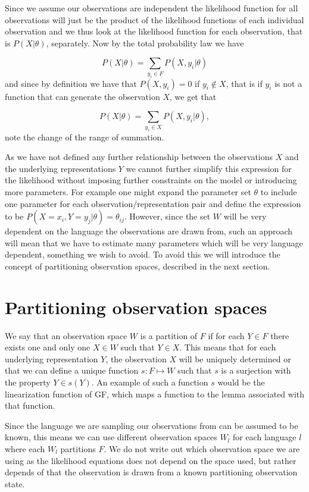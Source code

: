 Since we assume our observations are independent the likelihood function for all observations will just be the product of the likelihood functions of each individual observation and we thus look at the likelihood function for each observation, that is $P(X | \theta)$, separately. Now by the total probability law we have 

\begin{equation*}
P(X | \theta) = \sum_{y_i\in F}P(X,y_i | \theta)
\end{equation*}
and since by definition we have that $P(X,y_i)=0$ if $y_i\not\in X$, that is if $y_i$ is not a function that can generate the observation $X$, we get that 

\begin{equation*}
P(X | \theta) = \sum_{y_i\in X}P(X,y_i | \theta),
\end{equation*}
note the change of the range of summation.

As we have not defined any further relationship between the observations $X$ and the underlying representations $Y$ we cannot further simplify this expression for the likelihood without imposing further constraints on the model or introducing more parameters. For example one might expand the parameter set $\theta$ to include one parameter for each observation/representation pair and define the expression to be $P(X=x_i,Y=y_j | \theta)=\theta_{ij}$. However, since the set $W$ will be very dependent on the language the observations are drawn from, such an approach will mean that we have to estimate many parameters which will be very language dependent, something we wish to avoid. To avoid this we will introduce the concept of partitioning observation spaces, described in the next section.

\section{Partitioning observation spaces}
We say that an observation space $W$ is a partition of $F$ if for each $Y\in F$ there exists one and only one $X\in W$ such that $Y\in X$. This means that for each underlying representation $Y$, the observation $X$ will be uniquely determined or that we can define a unique function $s: F\mapsto W$ such that $s$ is a surjection with the property $Y\in s(Y)$. An example of such a function $s$ would be the linearization function of GF, which maps a function to the lemma associated with that function. 

Since the language we are sampling our observations from can be assumed to be known, this means we can use different observation spaces $W_l$ for each language $l$ where each $W_l$ partitions $F$. We do not write out which observation space we are using as the likelihood equations does not depend on the space used, but rather depends of that the observation is drawn from a known partitioning observation state.

